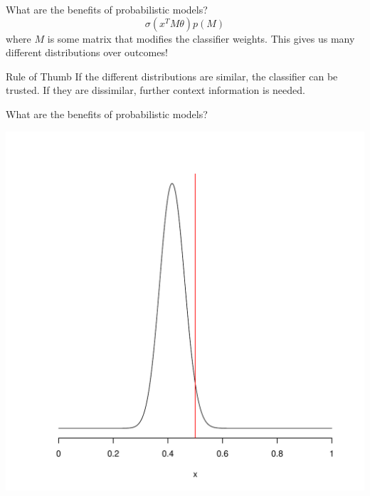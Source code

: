 \documentclass[14pt, aspectratio=169]{beamer}\usepackage[]{graphicx}\usepackage[]{color}
\makeatletter
\def\maxwidth{ %
  \ifdim\Gin@nat@width>\linewidth
    \linewidth
  \else
    \Gin@nat@width
  \fi
}
\newenvironment{knitrout}{}{} %
\makeatother
\begin{document}
\begin{frame}{What are the benefits of probabilistic models?}
\begin{equation*}
\sigma\left(x^{T}M\theta\right) p(M)
\end{equation*}
where $ M $ is some matrix that modifies the classifier weights. \pause
This gives us many different distributions over outcomes!
\pause
\begin{block}{Rule of Thumb}
If the different distributions are similar, the classifier can be trusted. If they are dissimilar, further context information is needed.
\end{block}
\end{frame}

\begin{frame}{What are the benefits of probabilistic models?}
\begin{knitrout}
\color{fgcolor}

{\centering \includegraphics[width=\maxwidth,height=.95\textheight,keepaspectratio]{figures/beta_narrow-1} 

}



\end{knitrout}
\end{frame}
\end{document}
